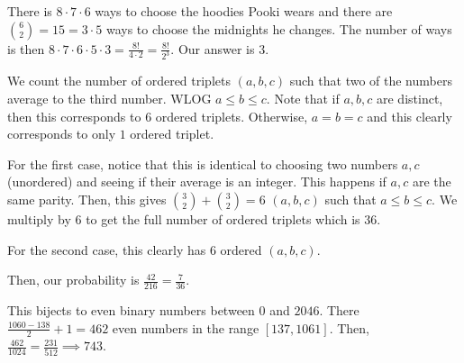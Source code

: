 \documentclass[11pt]{article}
\begin{document}
\begin{sol} 
There is $8\cdot 7\cdot 6$ ways to choose the hoodies Pooki wears and there are $\binom{6}{2}=15=3\cdot 5$ ways to choose the midnights he changes. The number of ways is then $8\cdot 7\cdot 6\cdot 5\cdot 3 = \frac{8!}{4\cdot 2}=\frac{8!}{2^{3}}$. Our answer is $\boxed{3}$.
\end{sol}


\begin{sol} 
We count the number of ordered triplets $(a,b,c)$ such that two of the numbers average to the third number. WLOG $a\leq b\leq c$. Note that if $a,b,c$ are distinct, then this corresponds to $6$ ordered triplets. Otherwise, $a=b=c$ and this clearly corresponds to only $1$ ordered triplet.

For the first case, notice that this is identical to choosing two numbers $a,c$ (unordered) and seeing if their average is an integer. This happens if $a,c$ are the same parity. Then, this gives $\binom{3}{2} + \binom{3}{2}=6$ $(a,b,c)$ such that $a\leq b\leq c$. We multiply by $6$ to get the full number of ordered triplets which is $36$.

For the second case, this clearly has $6$ ordered $(a,b,c)$.

Then, our probability is $\frac{42}{216}=\boxed{\frac{7}{36}}$.
\end{sol}


\begin{sol} 
This bijects to even binary numbers between $0$ and $2046$. There $\frac{1060-138}{2}+1=462$ even numbers in the range $[137,1061]$. Then, $\frac{462}{1024}=\frac{231}{512}\implies \boxed{743}$.
\end{sol}

\end{document}
